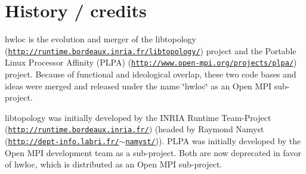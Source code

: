  \hypertarget{index_history}{}\section{History / credits}\label{index_history}
hwloc is the evolution and merger of the libtopology (\href{http://runtime.bordeaux.inria.fr/libtopology/}{\tt http://runtime.bordeaux.inria.fr/libtopology/}) project and the Portable Linux Processor Affinity (PLPA) (\href{http://www.open-mpi.org/projects/plpa/}{\tt http://www.open-mpi.org/projects/plpa/}) project. Because of functional and ideological overlap, these two code bases and ideas were merged and released under the name \char`\"{}hwloc\char`\"{} as an Open MPI sub-project.

libtopology was initially developed by the INRIA Runtime Team-Project (\href{http://runtime.bordeaux.inria.fr/}{\tt http://runtime.bordeaux.inria.fr/}) (headed by Raymond Namyst (\href{http://dept-info.labri.fr/~namyst/}{\tt http://dept-info.labri.fr/$\sim$namyst/})). PLPA was initially developed by the Open MPI development team as a sub-project. Both are now deprecated in favor of hwloc, which is distributed as an Open MPI sub-project.

 
